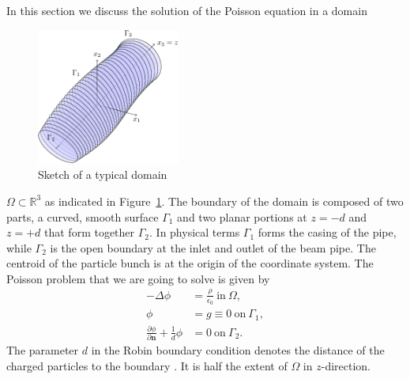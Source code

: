\documentclass[a4paper,10pt,3p,preprint,pdftex]{elsarticle}
\renewcommand{\Re}{\mathbb{R}}
\begin{document}
In this section we discuss the solution of the Poisson equation in a
domain 
\begin{figure}[htb]
  \centering
  \includegraphics[width=0.42\textwidth]{figbound.pdf}
  \caption{Sketch of a typical domain}
  \label{fig:domain}
\end{figure}
$\Omega \subset \Re^3$ as indicated in Figure~\ref{fig:domain}.  The
boundary of the domain is composed of two parts, a curved, smooth
surface $\Gamma_1$ and two planar portions at $z=-d$ and $z=+d$ that
form together $\Gamma_2$.  In physical terms $\Gamma_1$ forms the casing
of the pipe, while $\Gamma_2$ is the open boundary at the inlet and
outlet of the beam pipe.  The centroid of the particle bunch is at the
origin of the coordinate system.  The Poisson problem that we are going
to solve is given by
\begin{equation} \label{eq:poisson}
  \begin{aligned}
    -\Delta \phi &= \frac{\rho}{\epsilon_0}\ \text{in}\ \Omega, \\
    \phi &= g \equiv 0\ \text{on}\ \Gamma_1,   \\
    \frac{\partial \phi}{\partial \mathbf{n}} + \frac {1}{d} \phi &= 0\
    \text{on}\ \Gamma_2.
  \end{aligned}
\end{equation}
The parameter $d$ in the Robin boundary condition denotes the distance
of the charged particles to the boundary \cite{poplau_self-adaptive_2008}.  It is half the extent of
$\Omega$ in $z$-direction. 
\end{document}
